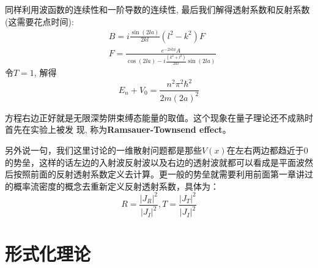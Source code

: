\documentclass[a4paper,zihao=-4,linespread=1]{ctexrep}
\begin{document}
    同样利用波函数的连续性和一阶导数的连续性, 最后我们解得透射系数和反射系数(这需要花点时间):
    \begin{equation}
        \begin{aligned}
        &B=i \frac{\sin (2 l a)}{2 k l}\left(l^{2}-k^{2}\right) F \\
        &F=\frac{e^{-2 i k a} A}{\cos (2 l a)-i \frac{\left(k^{2}+l^{2}\right)}{2 k l} \sin (2 l a)}
        \end{aligned}
    \end{equation}
    令$T=1$, 解得$$E_n+V_0=\frac{n^2\pi^2\hbar^2}{2m(2a)^2}$$
    
    方程右边正好就是无限深势阱束缚态能量的取值。这个现象在量子理论还不成熟时首先在实验上被发
    现, 称为\textbf{Ramsauer-Townsend effect}。
    
    另外说一句，我们这里讨论的一维散射问题都是那些$V(x)$在左右两边都趋近于0的势垒，这样的话左边的入射波反射波以及右边的透射波就都可以看成是平面波然后按照前面的反射透射系数定义去计算。更一般的势垒就需要利用前面第一章讲过的概率流密度的概念去重新定义反射透射系数，具体为：
    \begin{equation}
    	R=\frac{|J_R|^2}{|J_I|^2},T=\frac{|J_T|^2}{|J_I|^2}
    \end{equation}
    
   
    \chapter{形式化理论}
\end{document}
